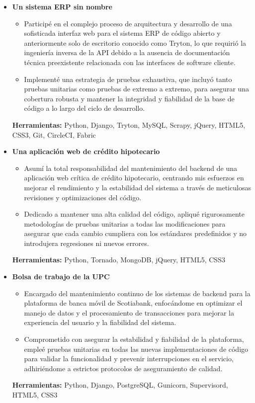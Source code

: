 \documentclass[11pt,a4paper,english]{moderncv}
\begin{document}
{
\begin{itemize}
    \item \textbf{Un sistema ERP sin nombre}
        \begin{itemize}
            \item Participé en el complejo proceso de arquitectura y desarrollo de una sofisticada interfaz web para el sistema ERP de código abierto y anteriormente solo de escritorio conocido como Tryton, lo que requirió la ingeniería inversa de la API debido a la ausencia de documentación técnica preexistente relacionada con las interfaces de software cliente.
            \item Implementé una estrategia de pruebas exhaustiva, que incluyó tanto pruebas unitarias como pruebas de extremo a extremo, para asegurar una cobertura robusta y mantener la integridad y fiabilidad de la base de código a lo largo del ciclo de desarrollo.
        \end{itemize}
        \textbf{Herramientas:} Python, Django, Tryton, MySQL, Scrapy, jQuery, HTML5, CSS3, Git, CircleCI, Fabric
    \item \textbf{Una aplicación web de crédito hipotecario}
        \begin{itemize}
            \item Asumí la total responsabilidad del mantenimiento del backend de una aplicación web crítica de crédito hipotecario, centrando mis esfuerzos en mejorar el rendimiento y la estabilidad del sistema a través de meticulosas revisiones y optimizaciones del código.
            \item Dedicado a mantener una alta calidad del código, apliqué rigurosamente metodologías de pruebas unitarias a todas las modificaciones para asegurar que cada cambio cumpliera con los estándares predefinidos y no introdujera regresiones ni nuevos errores.
        \end{itemize}
        \textbf{Herramientas:} Python, Tornado, MongoDB, jQuery, HTML5, CSS3
    \item \textbf{Bolsa de trabajo de la UPC}
        \begin{itemize}
            \item Encargado del mantenimiento continuo de los sistemas de backend para la plataforma de banca móvil de Scotiabank, enfocándome en optimizar el manejo de datos y el procesamiento de transacciones para mejorar la experiencia del usuario y la fiabilidad del sistema.
            \item Comprometido con asegurar la estabilidad y fiabilidad de la plataforma, empleé pruebas unitarias en todas las nuevas implementaciones de código para validar la funcionalidad y prevenir interrupciones en el servicio, adhiriéndome a estrictos protocolos de aseguramiento de calidad.
        \end{itemize}
        \textbf{Herramientas:} Python, Django, PostgreSQL, Gunicorn, Supervisord, HTML5, CSS3
\end{itemize}
}
\end{document}
